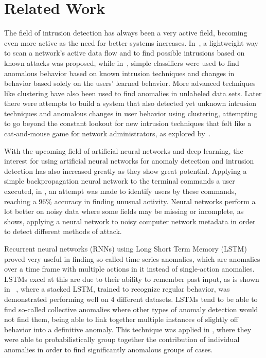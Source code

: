 \chapter{Related Work}\label{ch:related_work}

The field of intrusion detection has always been a very active field, becoming even more active as the need for better systems increases. In~\cite{roesch1999snort}, a lightweight way to scan a network's active data flow and to find possible intrusions based on known attacks was proposed, while in~\cite{lee1998data}, simple classifiers were used to find anomalous behavior based on known intrusion techniques and changes in behavior based solely on the users' learned behavior. More advanced techniques like clustering have also been used to find anomalies in unlabeled data sets. Later  there were attempts to build a system that also detected yet unknown intrusion techniques and anomalous changes in user behavior using clustering, attempting to go beyond the constant lookout for new intrusion techniques that felt like a cat-and-mouse game for network administrators, as explored by~\cite{Portnoy01intrusiondetection}.

With the upcoming field of artificial neural networks and deep learning, the interest for using artificial neural networks for anomaly detection and intrusion detection has also increased greatly as they show great potential. Applying a simple backpropagation neural network to the terminal commands a user executed, in \cite{ryan1998intrusion}, an attempt was made to identify users by these commands, reaching a 96\% accuracy in finding unusual activity. Neural networks perform a lot better on noisy data where some fields may be missing or incomplete, as \cite{cannady1998artificial} shows, applying a neural network to noisy computer network metadata in order to detect different methods of attack.

Recurrent neural networks (RNNs) using Long Short Term Memory (LSTM) proved very useful in finding so-called time series anomalies, which are anomalies over a time frame with multiple actions in it instead of single-action anomalies. LSTMs excel at this are due to their ability to remember past input, as is shown in ~\cite{malhotra2015long}, where a stacked LSTM, trained to recognize regular behavior, was demonstrated performing well on 4 different datasets. LSTMs tend to be able to find so-called collective anomalies where other types of anomaly detection would not find them, being able to link together multiple instances of slightly off behavior into a definitive anomaly. This technique was applied in \cite{olsson2015probabilistic}, where they were able to probabilistically group together the contribution of individual anomalies in order to find significantly anomalous groups of cases.